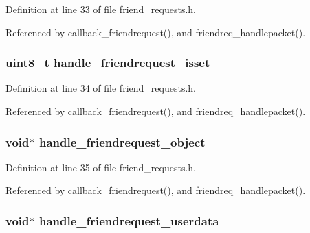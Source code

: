 Definition at line 33 of file friend\+\_\+requests.\+h.



Referenced by callback\+\_\+friendrequest(), and friendreq\+\_\+handlepacket().

\hypertarget{struct_friend___requests_aef7d18a109ced43f4cb3069083a91e69}{
\subsubsection[{handle\+\_\+friendrequest\+\_\+isset}]{\setlength{\rightskip}{0pt plus 5cm}uint8\+\_\+t handle\+\_\+friendrequest\+\_\+isset}}\label{struct_friend___requests_aef7d18a109ced43f4cb3069083a91e69}


Definition at line 34 of file friend\+\_\+requests.\+h.



Referenced by callback\+\_\+friendrequest(), and friendreq\+\_\+handlepacket().

\hypertarget{struct_friend___requests_a21949251a7cb2ba8e6e3f973c8fdd01c}{
\subsubsection[{handle\+\_\+friendrequest\+\_\+object}]{\setlength{\rightskip}{0pt plus 5cm}void$\ast$ handle\+\_\+friendrequest\+\_\+object}}\label{struct_friend___requests_a21949251a7cb2ba8e6e3f973c8fdd01c}


Definition at line 35 of file friend\+\_\+requests.\+h.



Referenced by callback\+\_\+friendrequest(), and friendreq\+\_\+handlepacket().

\hypertarget{struct_friend___requests_a59dcbf63199ca147db439e5ade631a81}{
\subsubsection[{handle\+\_\+friendrequest\+\_\+userdata}]{\setlength{\rightskip}{0pt plus 5cm}void$\ast$ handle\+\_\+friendrequest\+\_\+userdata}}\label{struct_friend___requests_a59dcbf63199ca147db439e5ade631a81}


